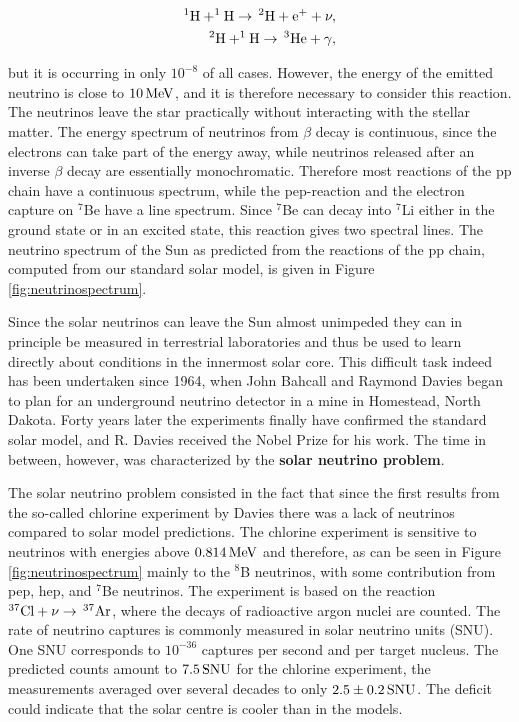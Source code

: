 \documentclass[a4paper,10pt]{article}
\begin{document}
\begin{align*}
    {\rm ^1H+^1H \rightarrow\,^2H+e^++\nu,} \\
    {\rm ^2H+^1H \rightarrow \,^3He+\gamma},
\end{align*}

{\noindent}but it is occurring in only $10^{-8}$ of all cases. However, the energy of the emitted neutrino is close to $10\,{\rm MeV}$, and it is therefore necessary to consider this reaction. The neutrinos leave the star practically without interacting with the stellar matter. The energy spectrum of neutrinos from $\beta$ decay is continuous, since the electrons can take part of the energy away, while neutrinos released after an inverse $\beta$ decay are essentially monochromatic. Therefore most reactions of the pp chain have a continuous spectrum, while the pep-reaction and the electron capture on $^7$Be have a line spectrum. Since $^7$Be can decay into $^7$Li either in the ground state or in an excited state, this reaction gives two spectral lines. The neutrino spectrum of the Sun as predicted from the reactions of the pp chain, computed from our standard solar model, is given in Figure \ref{fig:neutrinospectrum}.

{\noindent}Since the solar neutrinos can leave the Sun almost unimpeded they can in principle be measured in terrestrial laboratories and thus be used to learn directly about conditions in the innermost solar core. This difficult task indeed has been undertaken since 1964, when John Bahcall and Raymond Davies began to plan for an underground neutrino detector in a mine in Homestead, North Dakota. Forty years later the experiments finally have confirmed the standard solar model, and R. Davies received the Nobel Prize for his work. The time in between, however, was characterized by the \textbf{solar neutrino problem}.

{\noindent}The solar neutrino problem consisted in the fact that since the first results from the so-called chlorine experiment by Davies there was a lack of neutrinos compared to solar model predictions. The chlorine experiment is sensitive to neutrinos with energies above $0.814\,{\rm MeV}$ and therefore, as can be seen in Figure \ref{fig:neutrinospectrum} mainly to the $^8$B neutrinos, with some contribution from pep, hep, and $^7$Be neutrinos. The experiment is based on the reaction $^{37}{\rm Cl}+\nu\rightarrow\,^{37}{\rm Ar}$, where the decays of radioactive argon nuclei are counted. The rate of neutrino captures is commonly measured in solar neutrino units (SNU). One SNU corresponds to $10^{-36}$ captures per second and per target nucleus. The predicted counts amount to $7.5\,{\rm SNU}$ for the chlorine experiment, the measurements averaged over several decades to only $2.5\pm0.2\,{\rm SNU}$. The deficit could indicate that the solar centre is cooler than in the models.
\end{document}
